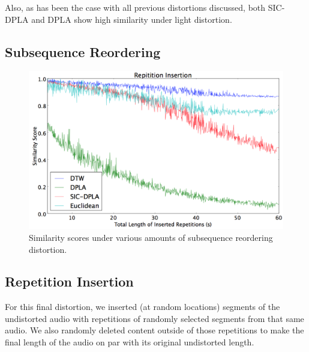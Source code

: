 \documentclass[a4paper,12pt]{report} 	%
\numberwithin{figure}{chapter}
\numberwithin{table}{chapter}
\numberwithin{equation}{chapter}
\begin{document}
\begin{flushleft}
Also, as has been the case with all previous distortions discussed, both SIC-DPLA and DPLA show high similarity under light distortion.

\subsection{Subsequence Reordering}

\begin{figure}[h!]
\begin{center}
\includegraphics[scale=0.5,width=\linewidth]{RepetitionInsertion}
\caption[Subsequence Reordering Results]{Similarity scores under various amounts of subsequence reordering distortion.}
\end{center}
\end{figure}

\subsection{Repetition Insertion}
For this final distortion, we inserted (at random locations) segments of the undistorted audio with repetitions of randomly selected segments from that same audio. We also randomly deleted content outside of those repetitions to make the final length of the audio on par with its original undistorted length.


\end{flushleft}
\end{document}
